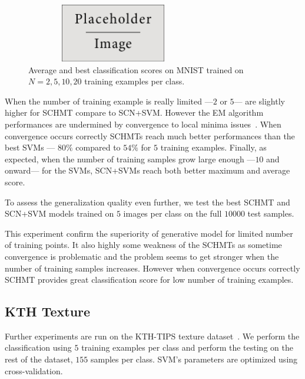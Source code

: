 \documentclass{article}
\begin{document}
		\begin{figure}
			\begin{center}
				\includegraphics[width=3in, height= 1in]{placeholder.jpg}
			  \caption[MNIST: classification scores]{Average and best classification scores on MNIST trained on $N=2,5,10,20$ training examples per class.}
			  \label{fig:SCHMT MNIST}
			\end{center}
			\vspace{-20pt}
		\end{figure}
		When the number of training example is really limited ---\ie $2$ or $5$--- are slightly higher for SCHMT compare to SCN+SVM. However the EM algorithm performances are undermined by convergence to local minima issues~\cite{moon1996expectation}. When convergence occurs correctly SCHMTs reach much better performances than the best SVMs --- $80\%$ compared to $54\%$ for $5$ training examples. Finally, as expected, when the number of training samples grow large enough ---\ie $10$ and onward--- for the SVMs, SCN+SVMs reach both better maximum and average score.
		
		To assess the generalization quality even further, we test the best SCHMT and SCN+SVM models trained on $5$ images per class on the full $10000$ test samples. %
		
		This experiment confirm the superiority of generative model for limited number of training points. It also highly some weakness of the SCHMTs as sometime convergence is problematic and the problem seems to get stronger when the number of training samples increases. However when convergence occurs correctly SCHMT provides great classification score for low number of training examples.
		
	\subsection{KTH Texture}
		\label{subsec:Exps/KTH Texture}
		
		Further experiments are run on the KTH-TIPS texture dataset~\cite{KTH2016web}. We perform the classification using $5$ training examples per class and perform the testing on the rest of the dataset, \ie $155$ samples per class. SVM's parameters are optimized using cross-validation.
		
\end{document}
